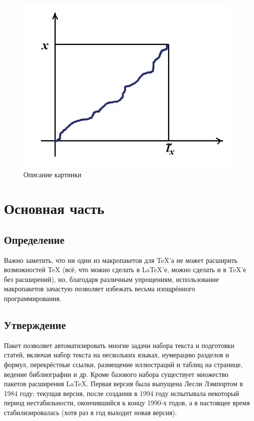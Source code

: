 \documentclass[14pt,a4paper,oneside]{article}
\begin{document}
\begin{figure}[t]
\centering
\includegraphics[scale=0.5]{1.jpg}
\caption{Описание картинки}
\label{fig:pic}
\end{figure}

\newpage
\section{Основная часть}
\subsection{Определение}
Важно заметить, что ни один из макропакетов для TeX’а не может расширить возможностей TeX (всё, что можно сделать в LaTeX’е, можно сделать и в TeX’е без расширений), но, благодаря различным упрощениям, использование макропакетов зачастую позволяет избежать весьма изощрённого программирования.
\subsection{Утверждение}
Пакет позволяет автоматизировать многие задачи набора текста и подготовки статей, включая набор текста на нескольких языках, нумерацию разделов и формул, перекрёстные ссылки, размещение иллюстраций и таблиц на странице, ведение библиографии и др. Кроме базового набора существует множество пакетов расширения LaTeX. Первая версия была выпущена Лесли Лэмпортом в 1984 году; текущая версия, после создания в 1994 году испытывала некоторый период нестабильности, окончившийся к концу 1990-х годов, а в настоящее время стабилизировалась (хотя раз в год выходит новая версия).

\newpage
\end{document}
